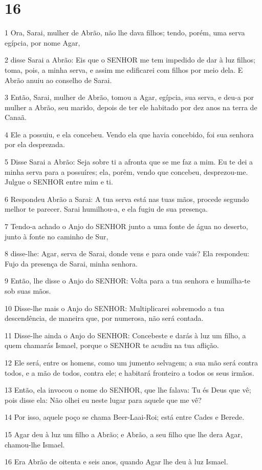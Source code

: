 \chapter{16}

\par 1 Ora, Sarai, mulher de Abrão, não lhe dava filhos; tendo, porém, uma serva egípcia, por nome Agar,
\par 2 disse Sarai a Abrão: Eis que o SENHOR me tem impedido de dar à luz filhos; toma, pois, a minha serva, e assim me edificarei com filhos por meio dela. E Abrão anuiu ao conselho de Sarai.
\par 3 Então, Sarai, mulher de Abrão, tomou a Agar, egípcia, sua serva, e deu-a por mulher a Abrão, seu marido, depois de ter ele habitado por dez anos na terra de Canaã.
\par 4 Ele a possuiu, e ela concebeu. Vendo ela que havia concebido, foi sua senhora por ela desprezada.
\par 5 Disse Sarai a Abrão: Seja sobre ti a afronta que se me faz a mim. Eu te dei a minha serva para a possuíres; ela, porém, vendo que concebeu, desprezou-me. Julgue o SENHOR entre mim e ti.
\par 6 Respondeu Abrão a Sarai: A tua serva está nas tuas mãos, procede segundo melhor te parecer. Sarai humilhou-a, e ela fugiu de sua presença.
\par 7 Tendo-a achado o Anjo do SENHOR junto a uma fonte de água no deserto, junto à fonte no caminho de Sur,
\par 8 disse-lhe: Agar, serva de Sarai, donde vens e para onde vais? Ela respondeu: Fujo da presença de Sarai, minha senhora.
\par 9 Então, lhe disse o Anjo do SENHOR: Volta para a tua senhora e humilha-te sob suas mãos.
\par 10 Disse-lhe mais o Anjo do SENHOR: Multiplicarei sobremodo a tua descendência, de maneira que, por numerosa, não será contada.
\par 11 Disse-lhe ainda o Anjo do SENHOR: Concebeste e darás à luz um filho, a quem chamarás Ismael, porque o SENHOR te acudiu na tua aflição.
\par 12 Ele será, entre os homens, como um jumento selvagem; a sua mão será contra todos, e a mão de todos, contra ele; e habitará fronteiro a todos os seus irmãos.
\par 13 Então, ela invocou o nome do SENHOR, que lhe falava: Tu és Deus que vê; pois disse ela: Não olhei eu neste lugar para aquele que me vê?
\par 14 Por isso, aquele poço se chama Beer-Laai-Roi; está entre Cades e Berede.
\par 15 Agar deu à luz um filho a Abrão; e Abrão, a seu filho que lhe dera Agar, chamou-lhe Ismael.
\par 16 Era Abrão de oitenta e seis anos, quando Agar lhe deu à luz Ismael.

